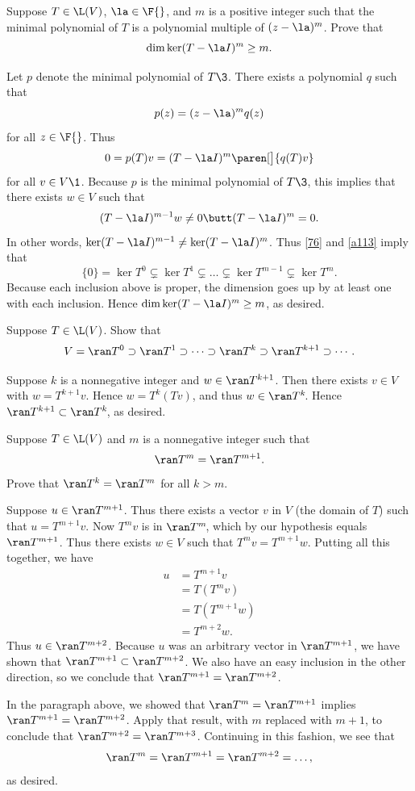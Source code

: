 \exercise
Suppose $T \in \L(V)$, $\la \in \F{}$, and $m$ is a positive integer such that the minimal polynomial of $T$ is a polynomial multiple of
$(z - \la)^m$. Prove that
\[
\dim \ker(T - \la I)^m \ge m.
\]
\exercisedisplayend

\begin{Solution}
Let $p$ denote the minimal polynomial of $T\3$. There exists a polynomial $q$ such that
\[
p(z) = (z-\la)^m q(z)
\]
for all $z \in \F{}$. Thus
\[
0 = p(T)v = (T - \la I)^m \paren[\big]{ q(T)v }
\]
for all $v \in V\1$. Because $p$ is the minimal polynomial of $T\3$, this implies that there exists $w \in V$ such that
\[
(T - \la I)^{m-1} w \ne 0 \butt (T - \la I)^m = 0.
\]
In other words, $\ker(T-\la I)^{m-1} \ne \ker(T - \la I)^m$. Thus \ref{76} and \ref{a113} imply that
\[
\{0\} = \ker T^0 \subsetneq \ker T^1 \subsetneq \dots
\subsetneq \ker T^{m-1} \subsetneq \ker T^m\!.
\]
Because each inclusion above is proper, the dimension goes up by at least one with each inclusion. Hence
$\dim \ker(T - \la I)^m \ge m$, as desired.
\end{Solution}

\exercise
Suppose $T \in \L(V)$. Show that \label{range1}
\[
V = \ran T^0 \supset \ran T^1 \supset \dots
\supset \ran T^k \supset \ran T^{k+1} \supset \dotsb .
\]
\exercisedisplayend

\begin{Solution}
Suppose $k$ is a nonnegative integer and $w \in \ran T^{k+1}$. Then there exists
$v \in V$ with $w = T^{k+1} v$. Hence $w = T^k(Tv)$, and thus $w \in \ran T^k\!$. Hence $\ran T^{k+1} \subset \ran T^k\!$, as desired.
\end{Solution}

\exercise
Suppose $T \in \L(V)$ and $m$ is a nonnegative integer such that \label{range2}
\[
\ran T^m = \ran T^{m+1}.
\]
Prove that $\ran T^k = \ran T^m$ for all $k > m$.

\begin{Solution}
Suppose $u \in \ran T^{m+1}$.  Thus there exists a vector $v$ in $V$ (the domain
of $T$) such that $u = T^{m+1} v$.  Now $T^m v$ is in $\ran T^m\!$, which by our
hypothesis equals $\ran T^{m+1}$.  Thus there exists $w \in V$ such that
$T^m v = T^{m+1} w$.  Putting all this together, we have
\begin{align*}
u &= T^{m+1} v \\
&= T(T^m v) \\
&= T(T^{m+1} w) \\
&= T^{m+2} w.
\end{align*}
Thus $u \in \ran T^{m+2}$.  Because $u$ was an arbitrary vector in $\ran T^{m+1}$,
we have shown that $\ran T^{m+1} \subset \ran T^{m+2}$.  We also have an easy
inclusion in the other direction, so we conclude that
$\ran T^{m+1} = \ran T^{m+2}$.

In the paragraph above, we showed that $\ran T^m = \ran T^{m+1}$ implies
$\ran T^{m+1} = \ran T^{m+2}$.  Apply that result, with $m$ replaced with $m+1$, to
conclude that $\ran T^{m+2} = \ran T^{m+3}$.  Continuing in this fashion, we see
that
\[
\ran T^m = \ran T^{m+1} = \ran T^{m+2} = \dots,
\]
as desired.
\end{Solution}

